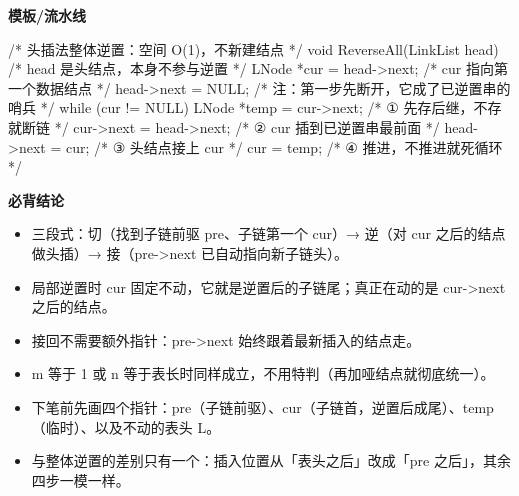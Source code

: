 \documentclass[10pt,a4paper]{ctexart}
\begin{document}
\textbf{模板/流水线}

\begin{codebox}
/* 头插法整体逆置：空间 O(1)，不新建结点 */
void ReverseAll(LinkList head) {           /* head 是头结点，本身不参与逆置 */
    LNode *cur = head->next;               /* cur 指向第一个数据结点 */
    head->next = NULL;                     /* 注：第一步先断开，它成了已逆置串的哨兵 */
    while (cur != NULL) {
        LNode *temp = cur->next;           /* ① 先存后继，不存就断链 */
        cur->next = head->next;            /* ② cur 插到已逆置串最前面 */
        head->next = cur;                  /* ③ 头结点接上 cur */
        cur = temp;                        /* ④ 推进，不推进就死循环 */
    }
}
\end{codebox}





\textbf{必背结论}

\begin{itemize}

\item 三段式：切（找到子链前驱 pre、子链第一个 cur）→ 逆（对 cur 之后的结点做头插）→ 接（pre->next 已自动指向新子链头）。

\item 局部逆置时 cur 固定不动，它就是逆置后的子链尾；真正在动的是 cur->next 之后的结点。

\item 接回不需要额外指针：pre->next 始终跟着最新插入的结点走。

\item m 等于 1 或 n 等于表长时同样成立，不用特判（再加哑结点就彻底统一）。

\item 下笔前先画四个指针：pre（子链前驱）、cur（子链首，逆置后成尾）、temp（临时）、以及不动的表头 L。

\item 与整体逆置的差别只有一个：插入位置从「表头之后」改成「pre 之后」，其余四步一模一样。

\end{itemize}
\end{document}
